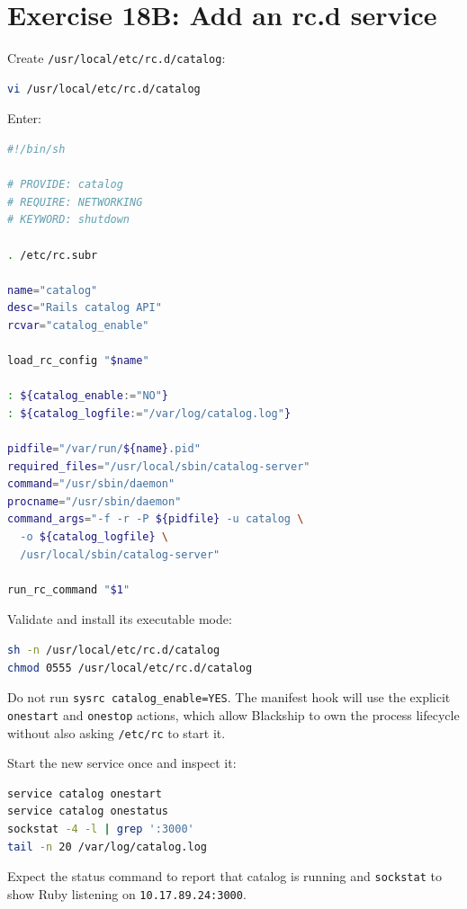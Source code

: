 \section{Exercise 18B: Add an rc.d service}

Create \texttt{/usr/local/etc/rc.d/catalog}:

\begin{lstlisting}[language=sh]
vi /usr/local/etc/rc.d/catalog
\end{lstlisting}

Enter:

\begin{lstlisting}[language=sh]
#!/bin/sh

# PROVIDE: catalog
# REQUIRE: NETWORKING
# KEYWORD: shutdown

. /etc/rc.subr

name="catalog"
desc="Rails catalog API"
rcvar="catalog_enable"

load_rc_config "$name"

: ${catalog_enable:="NO"}
: ${catalog_logfile:="/var/log/catalog.log"}

pidfile="/var/run/${name}.pid"
required_files="/usr/local/sbin/catalog-server"
command="/usr/sbin/daemon"
procname="/usr/sbin/daemon"
command_args="-f -r -P ${pidfile} -u catalog \
  -o ${catalog_logfile} \
  /usr/local/sbin/catalog-server"

run_rc_command "$1"
\end{lstlisting}

Validate and install its executable mode:

\begin{lstlisting}[language=sh]
sh -n /usr/local/etc/rc.d/catalog
chmod 0555 /usr/local/etc/rc.d/catalog
\end{lstlisting}

Do not run \texttt{sysrc catalog\_enable=YES}. The manifest hook will use the
explicit \texttt{onestart} and \texttt{onestop} actions, which allow Blackship
to own the process lifecycle without also asking \texttt{/etc/rc} to start it.

Start the new service once and inspect it:

\begin{lstlisting}[language=sh]
service catalog onestart
service catalog onestatus
sockstat -4 -l | grep ':3000'
tail -n 20 /var/log/catalog.log
\end{lstlisting}

Expect the status command to report that catalog is running and
\texttt{sockstat} to show Ruby listening on \texttt{10.17.89.24:3000}.

